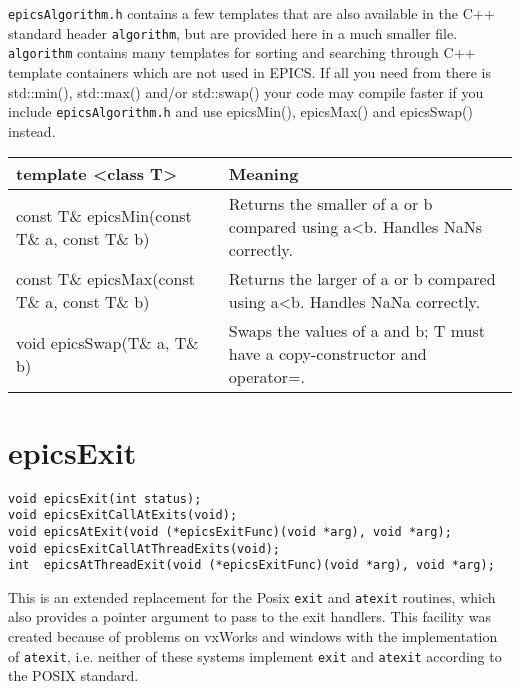 \verb|epicsAlgorithm.h| contains a few templates that are also available in the C++ standard header \verb|algorithm|, but are provided here in a much smaller file.
\verb|algorithm| contains many templates for sorting and searching through C++ template containers which are not used in EPICS.
If all you need from there is std::min(), std::max() and/or std::swap() your code may compile faster if you include \verb|epicsAlgorithm.h| and use epicsMin(), epicsMax() and epicsSwap() instead.

\begin{center}
\begin{longtable}{p{2.5in}p{4.25in}}
\textbf{template \textless{}class T\textgreater{}} & \textbf{Meaning}\\
\hline
const T\& epicsMin(const T\& a, const T\& b) & Returns the smaller of a or b compared using a\textless{}b. Handles NaNs correctly.\\
const T\& epicsMax(const T\& a, const T\& b) & Returns the larger of a or b compared using a\textless{}b. Handles NaNa correctly.\\
void epicsSwap(T\& a, T\& b) & Swaps the values of a and b; T must have a copy-constructor and operator=.
\end{longtable}

\end{center}


\section{epicsExit}

\begin{verbatim}
void epicsExit(int status);
void epicsExitCallAtExits(void);
void epicsAtExit(void (*epicsExitFunc)(void *arg), void *arg);
void epicsExitCallAtThreadExits(void);
int  epicsAtThreadExit(void (*epicsExitFunc)(void *arg), void *arg);
\end{verbatim}

This is an extended replacement for the Posix \verb|exit| and \verb|atexit| routines, which also provides a pointer argument to pass to the exit handlers.
This facility was created because of problems on vxWorks and windows with the implementation of \verb|atexit|, i.e. neither of these systems implement \verb|exit| and \verb|atexit| according to the POSIX standard.

